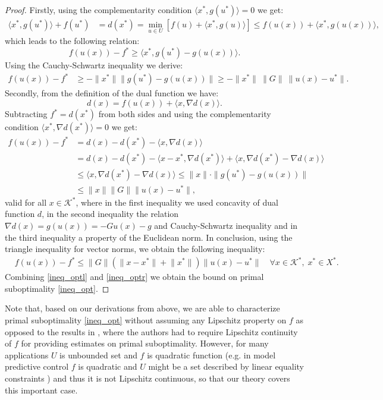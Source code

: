 \documentclass{gOMS2e}
\theoremstyle{plain}
\theoremstyle{definition}
\theoremstyle{remark}
\begin{document}
\begin{proof} Firstly, using the complementarity condition
$\langle x^*, g(u^*)  \rangle =0$ we get:
\begin{align*}
\langle x^*, g(u^*)  \rangle + f(u^*) & = d(x^*)  = \min_{u \in U} [
f(u) + \langle x^*, g(u) \rangle]  \leq f(u(x)) + \langle x^*,
g(u(x))  \rangle,
\end{align*}
which leads to the following relation:
\[  f(u(x)) - f^* \geq \langle x^*,  g(u^*) - g(u(x))  \rangle. \]
Using the Cauchy-Schwartz inequality we derive:
\begin{align}
\label{ineq_optl} f(u(x)) - f^* & \geq - \|x^*\| \|g(u^*) - g(u(x))
\| \geq  - \|x^*\| \ \|G\| \ \|{}{u}(x) - u^* \|.
\end{align}
Secondly, from the definition of the dual function we have:
\[ d(x) = f(u(x)) + \langle x,  \nabla d(x) \rangle. \] Subtracting $f^* = d(x^*)$ from both sides and
using the complementarity condition $ \langle x^*, \nabla d(x^*)
\rangle =0 $ we get:
\begin{align}
f(u(x)) - f^* & = d(x) - d(x^*) - \langle
x, \nabla d(x) \rangle \nonumber \\
& = d(x) - d(x^*) - \langle x - x^*, \nabla d(x^*)
\rangle + \langle x, \nabla
d(x^*) - \nabla d(x) \rangle \nonumber\\
& \leq \langle x, \nabla d(x^*) - \nabla d(x) \rangle  \leq \| x \|
\cdot \|g(u^*)  - g(u(x)) \| \nonumber\\
& \leq \| x \|  \|G\| \| {}{u}(x) - u^* \|, \label{ineq_feas3}
\end{align}
valid for all $x \in {{\mathcal{K}}^*}$, where in the first inequality we used
concavity of dual function $d$, in the second inequality the
relation $\nabla d(x) = g(u(x)) = - G u(x) - g$ and Cauchy-Schwartz
inequality and in the third inequality a property of the Euclidean
norm. In conclusion, using the triangle inequality for vector norms,
we obtain the following inequality:
\begin{align}
\label{ineq_optr} & f(u(x)) - f^* \leq  \|G\| \left( \| x - x^* \|
\!+\! \|x^*\| \right)  \| {}{u}(x) - u^* \| \quad \forall x \in {{\mathcal{K}}^*},
\; x^* \in X^*.
\end{align}
Combining \eqref{ineq_optl} and \eqref{ineq_optr} we obtain the
bound on primal suboptimality   \eqref{ineq_opt}.
\end{proof}

\noindent Note that, based on our derivations from above,  we are
able to characterize primal suboptimality \eqref{ineq_opt} without
assuming any Lipschitz property on $f$ as opposed to the results in
\cite{BecNed:14}, where the authors had to require Lipschitz
continuity of $f$ for providing estimates on primal suboptimality.
However, for many applications $U$ is unbounded set and  $f$ is quadratic function
(e.g. in model predictive control $f$ is quadratic and $U$ might be a set described by linear equality constraints \cite{NecNed:13,PatBem:12})  and thus it is not Lipschitz continuous, so that our theory covers this important case.
\end{document}
